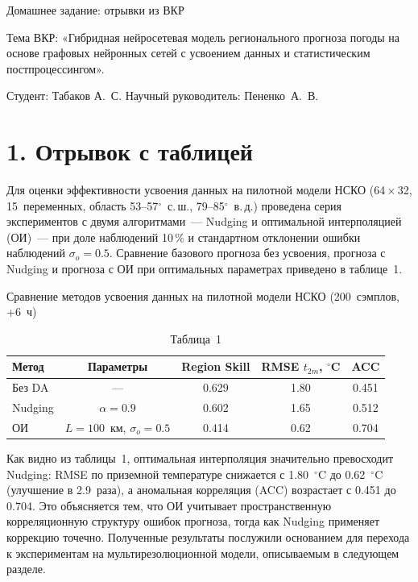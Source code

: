 \documentclass[a4paper,14pt]{extarticle}
\begin{document}
\begin{center}
Домашнее задание: отрывки из ВКР
\end{center}

\noindent Тема ВКР: «Гибридная нейросетевая модель регионального прогноза погоды на основе графовых нейронных сетей с усвоением данных и статистическим постпроцессингом».

\noindent Студент: Табаков А.~С. \quad Научный руководитель: Пененко~А.~В.

\bigskip

\section*{1. Отрывок с таблицей}

Для оценки эффективности усвоения данных на пилотной модели НСКО (64\,$\times$\,32, 15~переменных, область 53--57$^{\circ}$~с.\,ш., 79--85$^{\circ}$~в.\,д.) проведена серия экспериментов с двумя алгоритмами~--- Nudging и оптимальной интерполяцией (ОИ)~--- при доле наблюдений 10\,\% и стандартном отклонении ошибки наблюдений $\sigma_o = 0.5$. Сравнение базового прогноза без усвоения, прогноза с Nudging и прогноза с ОИ при оптимальных параметрах приведено в таблице~1.

\begin{table}[h!]
\caption{\hfill Таблица~1}
\vspace{-0.3em}
\begin{center}
Сравнение методов усвоения данных на пилотной модели НСКО (200~сэмплов, +6~ч)
\end{center}
\centering\small
\begin{tabular}{lcccc}
\toprule
Метод & Параметры & Region Skill & RMSE $t_{2m}$, $^{\circ}$C & ACC \\
\midrule
Без DA   & ---                                       & 0.629 & 1.80 & 0.451 \\
Nudging  & $\alpha = 0.9$                             & 0.602 & 1.65 & 0.512 \\
ОИ       & $L = 100$~км, $\sigma_o = 0.5$             & 0.414 & 0.62 & 0.704 \\
\bottomrule
\end{tabular}
\end{table}

Как видно из таблицы~1, оптимальная интерполяция значительно превосходит Nudging: RMSE по приземной температуре снижается с 1.80~$^{\circ}$C до 0.62~$^{\circ}$C (улучшение в 2.9~раза), а аномальная корреляция (ACC) возрастает с 0.451 до 0.704. Это объясняется тем, что ОИ учитывает пространственную корреляционную структуру ошибок прогноза, тогда как Nudging применяет коррекцию точечно. Полученные результаты послужили основанием для перехода к экспериментам на мультирезолюционной модели, описываемым в следующем разделе.
\end{document}
